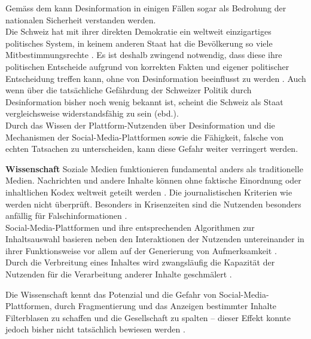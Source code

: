 \documentclass[12pt,a4paper]{article}        %
\begin{document}
Gemäss dem \textcites{bundesministerium_des_innern_und_fur_heimat_desinformation_2022}\parencite[zit.\ nach][15]{teetz_social-media-post_2023} kann Desinformation in einigen Fällen sogar als Bedrohung der nationalen Sicherheit verstanden werden. \\
Die Schweiz hat mit ihrer direkten Demokratie ein weltweit einzigartiges politisches System, in keinem anderen Staat hat die Bevölkerung so viele Mitbestimmungsrechte \parencite[2]{sager_politische_2017}. Es ist deshalb zwingend notwendig, dass diese ihre politischen Entscheide aufgrund von korrekten Fakten und eigener politischer Entscheidung treffen kann, ohne von Desinformation beeinflusst zu werden \parencite[26]{vogler_wahrnehmung_2021}\parencite[vgl.\ auch][14f]{european_parliament_directorate-general_for_external_policies_of_the_union_impact_2021}. Auch wenn über die tatsächliche Gefährdung der Schweizer Politik durch Desinformation bisher noch wenig bekannt ist, scheint die Schweiz als Staat vergleichsweise widerstandsfähig zu sein (ebd.).\\
Durch das Wissen der Plattform-Nutzenden über Desinformation und die Mechanismen der Social-Media-Plattformen sowie die Fähigkeit, falsche von echten Tatsachen zu unterscheiden, kann diese Gefahr weiter verringert werden.

\textbf{Wissenschaft}
\linebreak
Soziale Medien funktionieren fundamental anders als traditionelle Medien. Nachrichten und andere Inhalte können ohne faktische Einordnung oder inhaltlichen Kodex weltweit geteilt werden \parencite[211]{allcott_social_2017}. Die journalistischen Kriterien wie \parencite[9]{grujic_warnhinweise_2024} werden nicht überprüft. Besonders in Krisenzeiten sind die Nutzenden besonders anfällig für Falschinformationen \parencite[vgl.][2]{ceron_fake_2021}. \\
Social-Media-Plattformen und ihre entsprechenden Algorithmen zur Inhaltsauswahl basieren neben den Interaktionen der Nutzenden untereinander in ihrer Funktionsweise vor allem auf der Generierung von Aufmerksamkeit \parencites[vgl.][220]{schmidt_meinungsbildung_2022}[493]{behnke_manipulation_2018}. \\
Durch die Verbreitung eines Inhaltes wird zwangsläufig die Kapazität der Nutzenden für die Verarbeitung anderer Inhalte geschmälert \parencite[248]{hohlfeld_schlechte_2020}.

Die Wissenschaft kennt das Potenzial und die Gefahr von Social-Media-Plattformen, durch Fragmentierung und das Anzeigen bestimmter Inhalte Filterblasen zu schaffen und die Gesellschaft zu spalten – dieser Effekt konnte jedoch bisher nicht tatsächlich bewiesen werden \parencite[220]{schmidt_meinungsbildung_2022}.
\end{document}
